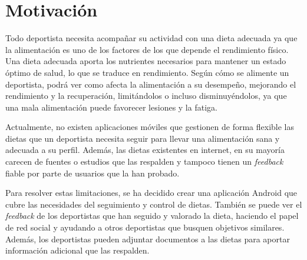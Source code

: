 \section{Motivación}



Todo deportista necesita acompañar su actividad con una dieta adecuada ya que la alimentación es uno de los factores de los que depende el rendimiento físico. Una dieta adecuada aporta los nutrientes necesarios para mantener un estado óptimo de salud, lo que se traduce en rendimiento. Según cómo se alimente un deportista, podrá ver como afecta la alimentación a su desempeño, mejorando el rendimiento y la recuperación, limitándolos o incluso disminuyéndolos, ya que una mala alimentación puede favorecer lesiones y la fatiga.

Actualmente, no existen aplicaciones móviles que gestionen de forma flexible las dietas que un deportista necesita seguir para llevar una alimentación sana y adecuada a su perfil. Además, las dietas existentes en internet, en su mayoría carecen de fuentes o estudios que las respalden y tampoco tienen un \textit{feedback} fiable por parte de usuarios que la han probado.

Para resolver estas limitaciones, se ha decidido crear una aplicación Android que cubre las necesidades del seguimiento y control de dietas. También se puede ver el \textit{feedback} de los deportistas que han seguido y valorado la dieta, haciendo el papel de red social y ayudando a otros deportistas que busquen objetivos similares. Además, los deportistas pueden adjuntar documentos a las dietas para aportar información adicional que las respalden.